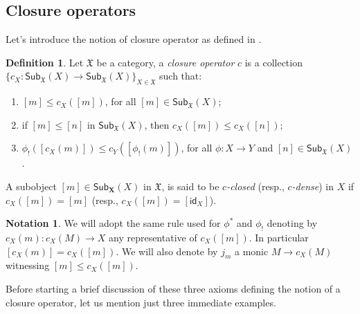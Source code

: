 \documentclass[12pt]{article}
\theoremstyle{definition}
\newtheorem{definition}[lemma]{Definition}
\newtheorem*{notaz}{Notation}
\def\X{\mathfrak X}
\numberwithin{equation}{section}
\newcommand{\catname}[1]{\mathbf{#1}}
\newcommand{\sub}[1]{\mathsf{Sub}_{\catname{#1}}}
\newcommand{\id}[1]{\mathsf{id}_{#1}}
\begin{document}
\subsection{Closure operators}
Let's introduce the notion of closure operator as defined in \cite{DT}.

\begin{definition}
Let $\X$ be a category, a {\em closure operator} $c$ is a collection $\{c_X:\sub{\X}(X)\rightarrow \sub{\X}(X)\}_{X \in {\X}}$ such that: 
\begin{enumerate}[\rm {(CO.}1)]
\item $[m] \leq c_X([m])$, for all $[m]\in \sub{\X}(X)$\quad [{\em expansion}]; 
\item if $[m] \leq [n]$ in $\sub{\X}(X)$, then $c_X([m]) \leq c_X([n])$\quad [{\em monotonicity}]; 
\item $\phi_!([c_X(m)]) \leq c_Y([\phi_!(m)])$, for all $\phi\colon X  \to  Y$	 and $[n]\in \sub{\X}(X)$\quad [{\em continuity}].
\end{enumerate} 
A subobject $[m]\in \sub{X}(X)$ in $\X$, is said to be {\em $c$-closed} (resp., {\em $c$-dense}) in $X$ if $c_X([m])=[m]$ (resp., $c_X([m])=[\id{X}]$).
\end{definition}
\begin{notaz}We will adopt the same rule used for $\phi^*$ and $\phi_!$ denoting by $c_X(m):c_X(M)\rightarrow X$ any representative of $c_X([m])$. In particular $[c_X(m)]=c_X([m])$. We will also denote by $j_m$ a monic $M\rightarrow c_X(M)$ witnessing $[m]\leq c_X([m])$.
\end{notaz}
Before starting a brief discussion of these three axioms defining the notion of a closure operator, let us
mention just three immediate examples. 
\end{document}
